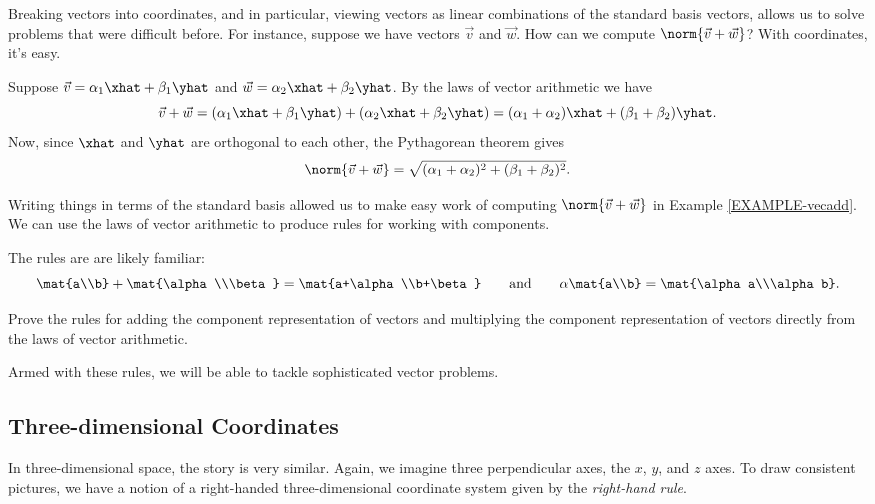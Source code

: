 Breaking vectors into coordinates, and in particular, viewing vectors as linear
combinations of the standard basis vectors, allows us to solve problems that were
difficult before.  For instance, suppose we have vectors $\vec v$ and $\vec w$.
How can we compute $\norm{\vec v+\vec w}$?  With coordinates, it's easy.

\begin{example}
	\label{EXAMPLE-vecadd}
	Suppose $\vec v=\alpha_1\xhat+\beta_1\yhat$ and $\vec w=\alpha_2\xhat+\beta_2\yhat$.
	By the laws of vector arithmetic we have
	\[
		\vec v+\vec w=(\alpha_1\xhat+\beta_1\yhat)+(\alpha_2\xhat+\beta_2\yhat)
		=(\alpha_1+\alpha_2)\xhat+(\beta_1+\beta_2)\yhat.
	\]
	Now, since $\xhat$ and $\yhat$ are orthogonal to each other,
	the Pythagorean theorem gives
	\[
		\norm{\vec v+\vec w} = \sqrt{(\alpha_1+\alpha_2)^2+(\beta_1+\beta_2)^2}.
	\]
\end{example}

Writing things in terms of the standard basis allowed us to make easy work
of computing $\norm{\vec v+\vec w}$ in Example \ref{EXAMPLE-vecadd}.  We can
use the laws of vector arithmetic to produce rules for working with components.

The rules are are likely familiar:
\[
	\mat{a\\b}+\mat{\alpha\\\beta} = \mat{a+\alpha\\b+\beta}
	\qquad\text{and}\qquad
	\alpha \mat{a\\b}=\mat{\alpha a\\\alpha b}.
\]

\begin{exercise}
	Prove the rules for adding the component representation
	of vectors and multiplying the component representation
	of vectors directly from the laws of vector arithmetic.
\end{exercise}

Armed with these rules, we will be able to tackle sophisticated vector
problems.

\subsection{Three-dimensional Coordinates}
In three-dimensional space, the story is very similar.  Again, we imagine
three perpendicular axes, the $x$, $y$, and $z$ axes.
To draw consistent
pictures, we have a notion of a right-handed three-dimensional coordinate
system given by the \emph{right-hand rule}.

